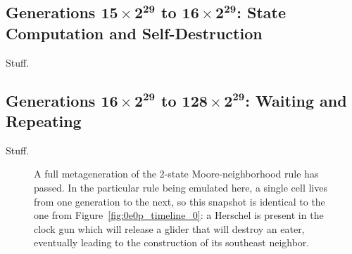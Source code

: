 

\subsection{Generations $\mathbf{15 \times 2^{29}}$ to $\mathbf{16 \times 2^{29}}$: State Computation and Self-Destruction}\label{sec:0e0p_timeline_self_dest}

Stuff.
%


\subsection{Generations $\mathbf{16 \times 2^{29}}$ to $\mathbf{128 \times 2^{29}}$: Waiting and Repeating}\label{sec:0e0p_timeline_wait_repeat}

Stuff.

\begin{figure}[!htb]
	\centering
	\caption{A full metageneration of the $2$-state Moore-neighborhood rule has passed. In the particular rule being emulated here, a single cell lives from one generation to the next, so this snapshot is identical to the one from Figure~\ref{fig:0e0p_timeline_0}: a Herschel is present in the clock gun which will release a glider that will destroy an eater, eventually leading to the construction of its southeast neighbor.}
	\label{fig:0e0p_timeline_68719476736}
\end{figure}


